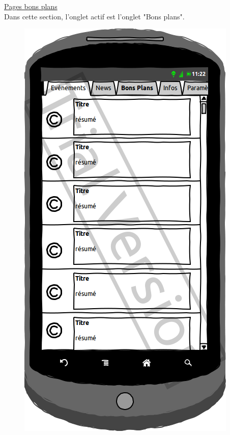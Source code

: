 \documentclass[a4paper, 11px]{article}
\begin{document}
\underline{Pages bons plans}\\
Dans cette section, l'onglet actif est l'onglet "Bons plans".
\begin{figure}[htbp]
	\begin{minipage}[c]{.50\linewidth}
		\begin{center}
			\includegraphics[scale=0.3]{../../Sketch/Android/BP.png}
		\end{center}
	\end{minipage}
	\hfill
	\begin{minipage}[c]{.50\linewidth}
		\begin{center}

\end{center}
\end{minipage}
\end{figure}
\end{document}
